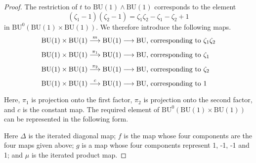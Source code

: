 \documentclass[../main]{subfiles}
\begin{document}
\begin{proof}
The restriction of $t$ to $\mathrm{BU}(1)\wedge\mathrm{BU}(1)$ corresponds to the element \[(\zeta_1-1)(\zeta_2-1)=\zeta_1\zeta_2-\zeta_1-\zeta_2+1\]
in $\mathrm{BU}^0(\mathrm{BU}(1)\times\mathrm{BU}(1))$. We therefore introduce the following maps.
\begin{align*}
\mathrm{BU}(1) \times \mathrm{BU}(1)\lar{m} \mathrm{BU}(1)\lra\mathrm{BU} &\text{, corresponding to } \zeta_1\zeta_2\\
\mathrm{BU}(1)\times\mathrm{BU}(1)\lar{\pi_1}\mathrm{BU}(1)\lra\mathrm{BU}&\text{, corresponding to } \zeta_1\\
\mathrm{BU}(1)\times\mathrm{BU}(1)\lar{\pi_2}\mathrm{BU}(1)\lra\mathrm{BU}&\text{, corresponding to } \zeta_2\\
\mathrm{BU}(1)\times\mathrm{BU}(1)\lar{c}\mathrm{BU}(1)\lra\mathrm{BU}&\text{, corresponding to } 1
\end{align*}
Here, $\pi_1$ is projection onto the first factor, $\pi_2$ is projection onto the second factor, and $c$ is the constant map. The required element of $\mathrm{BU}^0(\mathrm{BU}(1)\times\mathrm{BU}(1))$ can be represented in the following form.
\begin{center}
\end{center}
Here $\Delta$ is the iterated diagonal map; $f$ is the map whose four components are the four maps given above; $g$ is a map whose four components represent 1, -1, -1 and 1; and $\mu$ is the iterated product map.


\end{proof}
\end{document}
